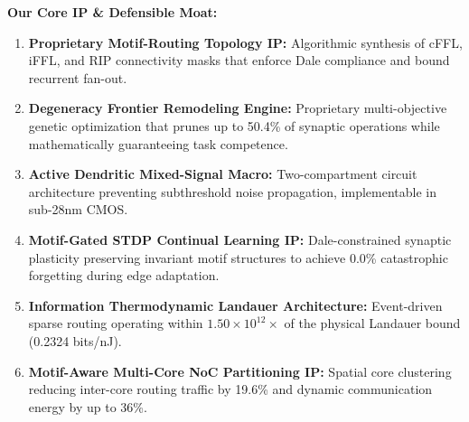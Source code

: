 \documentclass[11pt,letterpaper]{article}
\begin{document}
\begin{table}[h]
\centering
\small
{}
\end{table}

\textbf{Our Core IP \& Defensible Moat:}
\begin{enumerate}[leftmargin=*]
    \item \textbf{Proprietary Motif-Routing Topology IP:} Algorithmic synthesis of cFFL, iFFL, and RIP connectivity masks that enforce Dale compliance and bound recurrent fan-out.
    \item \textbf{Degeneracy Frontier Remodeling Engine:} Proprietary multi-objective genetic optimization that prunes up to 50.4\% of synaptic operations while mathematically guaranteeing task competence.
    \item \textbf{Active Dendritic Mixed-Signal Macro:} Two-compartment circuit architecture preventing subthreshold noise propagation, implementable in sub-28nm CMOS.
    \item \textbf{Motif-Gated STDP Continual Learning IP:} Dale-constrained synaptic plasticity preserving invariant motif structures to achieve 0.0\% catastrophic forgetting during edge adaptation.
    \item \textbf{Information Thermodynamic Landauer Architecture:} Event-driven sparse routing operating within $1.50 \times 10^{12}\times$ of the physical Landauer bound (0.2324 bits/nJ).
    \item \textbf{Motif-Aware Multi-Core NoC Partitioning IP:} Spatial core clustering reducing inter-core routing traffic by 19.6\% and dynamic communication energy by up to 36\%.
\end{enumerate}
\end{document}
